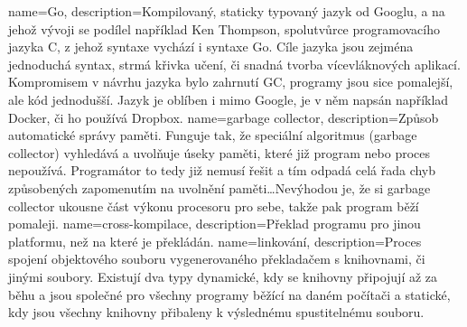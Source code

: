 {
  name={Go},
  description={Kompilovaný, staticky typovaný jazyk od Googlu, a na jehož vývoji se podílel například Ken Thompson, 
spolutvůrce programovacího jazyka C, z jehož syntaxe vychází i syntaxe Go. Cíle jazyka jsou zejména jednoduchá syntax, 
strmá křivka učení, či snadná tvorba vícevláknových aplikací. Kompromisem v návrhu jazyka bylo zahrnutí \gls{GC}, 
programy jsou sice pomalejší, ale kód jednodušší. Jazyk je oblíben i mimo Google, je v něm napsán například Docker, či 
ho používá Dropbox.}
}
{
  name={garbage collector},
  description={Způsob automatické správy paměti. Funguje tak, že speciální algoritmus (garbage collector) vyhledává 
a uvolňuje úseky paměti, které již program nebo proces nepoužívá. Programátor to tedy již nemusí řešit a tím odpadá celá 
řada chyb způsobených zapomenutím na uvolnění paměti\ldots Nevýhodou je, že si garbage collector ukousne část výkonu 
procesoru pro sebe, takže pak program běží pomaleji.}
}
{
  name={cross-kompilace},
  description={Překlad programu pro jinou platformu, než na které je překládán.}
}
{
  name={linkování},
  description={Proces spojení objektového souboru vygenerovaného překladačem s knihovnami, či jinými soubory. Existují 
dva typy dynamické, kdy se knihovny připojují až za běhu a jsou společné pro všechny programy běžící na daném počítači 
a statické, kdy jsou všechny knihovny přibaleny k výslednému spustitelnému souboru.}
}
